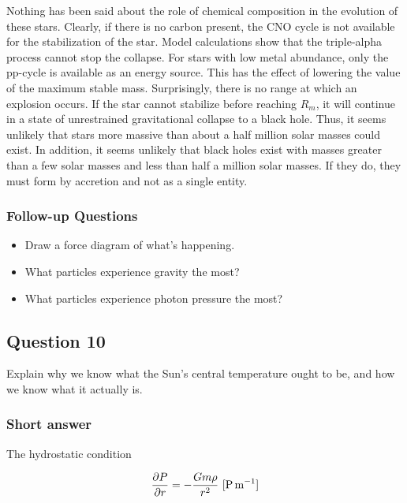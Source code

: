 \documentclass[a4paper,10pt]{article}
\begin{document}
{\noindent}Nothing has been said about the role of chemical composition in the evolution of these stars. Clearly, if there is no carbon present, the CNO cycle is not available for the stabilization of the star. Model calculations show that the triple-alpha process cannot stop the collapse. For stars with low metal abundance, only the pp-cycle is available as an energy source. This has the effect of lowering the value of the maximum stable mass. Surprisingly, there is no range at which an explosion occurs. If the star cannot stabilize before reaching $R_m$, it will continue in a state of unrestrained gravitational collapse to a black hole. Thus, it seems unlikely that stars more massive than about a half million solar masses could exist. In addition, it seems unlikely that black holes exist with masses greater than a few solar masses and less than half a million solar masses. If they do, they must form by accretion and not as a single entity.

\subsubsection{Follow-up Questions}

\begin{itemize}
    \item Draw a force diagram of what’s happening.
    \item What particles experience gravity the most?
    \item What particles experience photon pressure the most?
\end{itemize}


\newpage
\subsection{Question 10}

Explain why we know what the Sun's central temperature ought to be, and how we know what it actually is.

\subsubsection{Short answer}

The hydrostatic condition

\begin{align*}
    \frac{\partial P}{\partial r} = -\frac{Gm\rho}{r^2} ~ [{\rm P\,m^{-1}}]
\end{align*}
\end{document}
